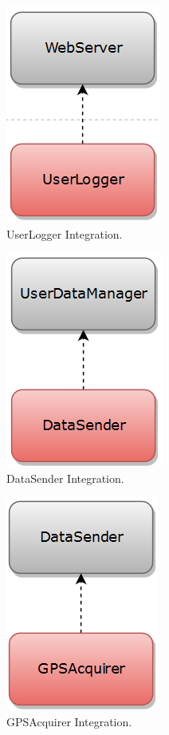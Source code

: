 \begin{figure}[H]
\centering
\includegraphics[scale=0.7]{Images/IntegrationPlanImages/fig7.png}
\caption{UserLogger Integration.}
\end{figure}

\begin{figure}[H]
\centering
\includegraphics[scale=0.7]{Images/IntegrationPlanImages/fig8.png}
\caption{DataSender Integration.}
\end{figure}

\begin{figure}[H]
\centering
\includegraphics[scale=0.7]{Images/IntegrationPlanImages/fig9.png}
\caption{GPSAcquirer Integration.}
\end{figure}

